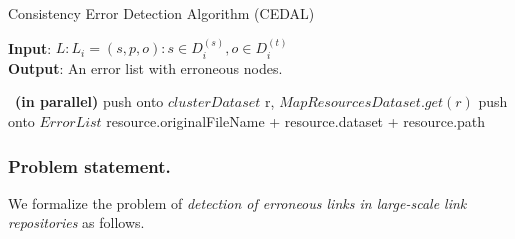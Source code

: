 %		

\begin{algorithm} [htb] 
	\caption{Consistency Error Detection Algorithm (CEDAL)}
	\label{alg:err}
	\begin{multicols}{2}
	\textbf{Input}: $L:L_i={(s,p,o):s \in D_i^{(s)}, o \in D_i^{(t)}}$ \\
	\textbf{Output}: An error list with erroneous nodes.
	\begin{algorithmic}[1]
		~\textbf{(in parallel)}
		push onto $clusterDataset$ r, $MapResourcesDataset.get(r)$
		\EndFor
		push onto $ErrorList$ resource.originalFileName + resource.dataset + resource.path
		\EndIf
		\EndFor
		\EndFor
		\EndProcedure
		
		 
		\EndFor
		\EndProcedure
	\end{algorithmic}
	\end{multicols}
\end{algorithm}

\subsubsection{Problem statement.}
We formalize the problem of \textit{detection of erroneous links in large-scale link repositories} as follows.

